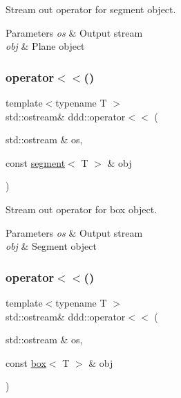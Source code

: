 Stream out operator for segment object. 


\begin{DoxyParams}{Parameters}
{\em os} & Output stream \\
\hline
{\em obj} & Plane object \\
\hline
\end{DoxyParams}
\mbox{\label{namespaceddd_a59e2fa950fd945aa8b3dd550720ad3f5}} 
\subsubsection{\texorpdfstring{operator$<$$<$()}{operator<<()}\hspace{0.1cm}{\footnotesize\ttfamily [6/10]}}
{\footnotesize\ttfamily template$<$typename T $>$ \\
std\+::ostream\& ddd\+::operator$<$$<$ (\begin{DoxyParamCaption}\item[{std\+::ostream \&}]{os,  }\item[{const \hyperlink{classddd_1_1segment}{segment}$<$ T $>$ \&}]{obj }\end{DoxyParamCaption})\hspace{0.3cm}{\ttfamily [inline]}}



Stream out operator for box object. 


\begin{DoxyParams}{Parameters}
{\em os} & Output stream \\
\hline
{\em obj} & Segment object \\
\hline
\end{DoxyParams}
\mbox{\label{namespaceddd_af710b0f11be50190553c743ce86545a3}} 
\subsubsection{\texorpdfstring{operator$<$$<$()}{operator<<()}\hspace{0.1cm}{\footnotesize\ttfamily [7/10]}}
{\footnotesize\ttfamily template$<$typename T $>$ \\
std\+::ostream\& ddd\+::operator$<$$<$ (\begin{DoxyParamCaption}\item[{std\+::ostream \&}]{os,  }\item[{const \hyperlink{classddd_1_1box}{box}$<$ T $>$ \&}]{obj }\end{DoxyParamCaption})\hspace{0.3cm}{\ttfamily [inline]}}



